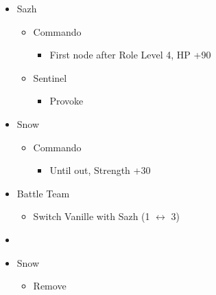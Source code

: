 \begin{menu}
\begin{multicols}{2}
\begin{itemize}
    \crystarium
    \begin{itemize}
        \item Sazh
        \begin{itemize}
            \item Commando
            \begin{itemize}
                \item First node after Role Level 4, HP +90
            \end{itemize}
            \item Sentinel
            \begin{itemize}
                \item Provoke
            \end{itemize}
        \end{itemize}
        \item Snow
        \begin{itemize}
            \item Commando
            \begin{itemize}
                \item Until out, Strength +30
            \end{itemize}
        \end{itemize}
    \end{itemize}
    \paradigm
    \begin{itemize}
        \item Battle Team
        \begin{itemize}
            \item Switch Vanille with Sazh (1 $\leftrightarrow$ 3)
        \end{itemize}
        \item {}%
{\paradigmline{\com}{\com}{\med}}%
{\paradigmline[2]{\textit{\com}}{\textit{\com}}{\textit{(\rav)}}}%
{\paradigmline{(\sen)}{\sen}{(\med)}}%
{\paradigmline{\syn}{\rav}{\rav}}%
{\paradigmline{\rav}{\rav}{\sab}}%
{\paradigmline{\rav}{\rav}{\rav}}
    \end{itemize}
    \columnbreak
    \equip
    \begin{itemize}
        \item Snow
        \begin{itemize}
            \item Remove
            \begin{itemize}

\end{itemize}
\end{itemize}
\end{itemize}
\end{itemize}
\end{multicols}
\end{menu}
